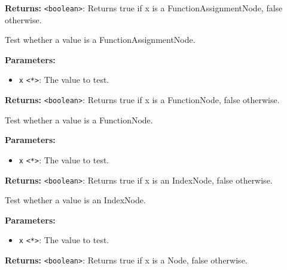 \documentclass[12pt,a4paper]{article}
\begin{document}
\noindent \textbf{Returns:} \texttt{<boolean>}: Returns true if \textasciigrave{}x\textasciigrave{} is a FunctionAssignmentNode, false otherwise.

\noindent Test whether a value is a FunctionAssignmentNode.

\vspace{5mm}
\noindent {}


\noindent \textbf{Parameters:}
\begin{itemize}
  \item \texttt{x} \texttt{<*>}: The value to test.
\end{itemize}

\noindent \textbf{Returns:} \texttt{<boolean>}: Returns true if \textasciigrave{}x\textasciigrave{} is a FunctionNode, false otherwise.

\noindent Test whether a value is a FunctionNode.

\vspace{5mm}
\noindent {}


\noindent \textbf{Parameters:}
\begin{itemize}
  \item \texttt{x} \texttt{<*>}: The value to test.
\end{itemize}

\noindent \textbf{Returns:} \texttt{<boolean>}: Returns true if \textasciigrave{}x\textasciigrave{} is an IndexNode, false otherwise.

\noindent Test whether a value is an IndexNode.

\vspace{5mm}
\noindent {}


\noindent \textbf{Parameters:}
\begin{itemize}
  \item \texttt{x} \texttt{<*>}: The value to test.
\end{itemize}

\noindent \textbf{Returns:} \texttt{<boolean>}: Returns true if \textasciigrave{}x\textasciigrave{} is a Node, false otherwise.
\end{document}
